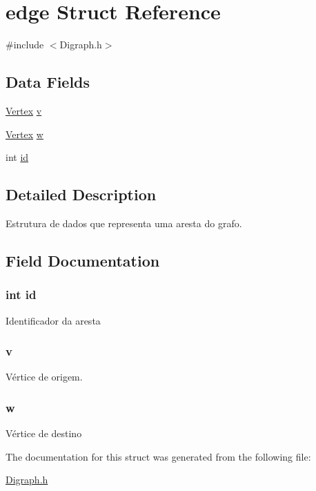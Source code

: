 \hypertarget{structedge}{}\section{edge Struct Reference}
\label{structedge}


{\ttfamily \#include $<$Digraph.\+h$>$}

\subsection*{Data Fields}
\begin{DoxyCompactItemize}
\item 
\hyperlink{_digraph_8h_a053624c5d4ef5549d6a3e25bf6b27b08}{Vertex} \hyperlink{structedge_a796e5c390de2ad622ad0fdd3d12a4c07}{v}
\item 
\hyperlink{_digraph_8h_a053624c5d4ef5549d6a3e25bf6b27b08}{Vertex} \hyperlink{structedge_ac6c3e84cdc714053b54b0d3e63abc3b3}{w}
\item 
int \hyperlink{structedge_a7441ef0865bcb3db9b8064dd7375c1ea}{id}
\end{DoxyCompactItemize}


\subsection{Detailed Description}
Estrutura de dados que representa uma aresta do grafo. 

\subsection{Field Documentation}
\subsubsection[{\texorpdfstring{id}{id}}]{\setlength{\rightskip}{0pt plus 5cm}int id}\hypertarget{structedge_a7441ef0865bcb3db9b8064dd7375c1ea}{}\label{structedge_a7441ef0865bcb3db9b8064dd7375c1ea}
Identificador da aresta 
\subsubsection[{\texorpdfstring{v}{v}}]{ v}\hypertarget{structedge_a796e5c390de2ad622ad0fdd3d12a4c07}{}\label{structedge_a796e5c390de2ad622ad0fdd3d12a4c07}
Vértice de origem. 
\subsubsection[{\texorpdfstring{w}{w}}]{ w}\hypertarget{structedge_ac6c3e84cdc714053b54b0d3e63abc3b3}{}\label{structedge_ac6c3e84cdc714053b54b0d3e63abc3b3}
Vértice de destino 

The documentation for this struct was generated from the following file\+:\begin{DoxyCompactItemize}
\item 
\hyperlink{_digraph_8h}{Digraph.\+h}\end{DoxyCompactItemize}
